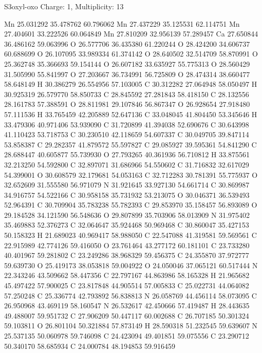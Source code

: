 \documentclass{article}
\begin{document}
S3oxyl-oxo   Charge: 1, Multiplicity: 13     
    
Mn 25.031292 35.478762 60.796062 
Mn 27.437229 35.125531 62.114751 
Mn 27.404601 33.222526 60.064849 
Mn 27.810209 32.956139 57.289457 
Ca 27.650844 36.486162 59.063996 
O 26.577706 36.435380 61.220244 
O 28.424200 34.606737 60.688699 
O 26.107095 33.989334 61.374142 
O 28.640502 32.514709 58.870991 
O 25.362748 35.366693 59.154144 
O 26.607182 33.635927 55.775313 
O 28.560429 31.505990 55.841997 
O 27.203667 36.734991 56.725809 
O 28.474314 38.660477 58.648149 
H 30.386279 26.554956 57.103005 
C 30.312282 27.064948 58.050497 
H 30.925319 26.579770 58.850733 
C 28.845592 27.281843 58.418150 
C 28.132556 28.161783 57.388591 
O 28.811981 29.107846 56.867347 
O 26.928654 27.918480 57.111536 
H 33.765459 42.205889 52.647136 
C 33.048045 41.804450 53.345646 
H 33.479306 40.971406 53.939090 
C 31.720899 41.394038 52.690676 
C 30.643998 41.110423 53.718753 
C 30.230510 42.118659 54.607337 
C 30.049705 39.847114 53.858387 
C 29.282357 41.879572 55.597827 
C 29.085927 39.595361 54.841290 
C 28.688447 40.605877 55.739930 
O 27.793265 40.361936 56.710812 
H 33.875561 32.213250 54.592800 
C 32.897071 31.686966 54.550602 
C 31.716832 32.617029 54.399001 
O 30.608579 32.179681 54.053163 
C 32.712283 30.781391 55.775937 
O 32.652609 31.555580 56.971079 
N 31.921645 33.927130 54.661714 
C 30.869987 34.916757 54.522166 
C 30.958158 35.731932 53.213075 
O 30.046371 36.539493 52.964391 
C 30.709904 35.783238 55.782393 
C 29.853970 35.158457 56.893089 
O 29.184528 34.121590 56.548636 
O 29.807899 35.703906 58.013909 
N 31.975402 35.469883 52.376273 
C 32.064647 35.924468 50.969468 
C 30.860047 35.427153 50.158323 
H 21.689023 40.969417 58.988050 
C 22.547088 41.319581 59.569561 
C 22.915989 42.774126 59.416050 
O 23.761464 43.277172 60.181101 
C 23.733280 40.401967 59.281802 
C 23.249286 38.968329 59.456375 
C 24.355870 37.972777 59.639730 
O 25.419173 38.053818 59.004922 
O 24.050046 37.065121 60.517444 
N 22.343246 43.509662 58.447356 
C 22.797167 44.863986 58.165328 
H 21.965682 45.497422 57.900025 
C 23.817848 44.905514 57.005833 
C 25.022731 44.064082 57.250248 
C 25.336774 42.793892 56.838813 
N 26.058769 44.456114 58.073095 
C 26.950968 43.469119 58.160547 
N 26.532617 42.450666 57.419487 
H 28.443635 49.488007 59.951732 
C 27.906209 50.447117 60.002688 
C 26.707185 50.301324 59.103811 
O 26.801104 50.321884 57.873149 
H 28.590318 51.232545 59.639607 
N 25.537135 50.060978 59.746098 
C 24.423094 49.401851 59.075556 
C 23.290712 50.340170 58.685934 
C 24.000784 48.194853 59.916459 
\end{document}
